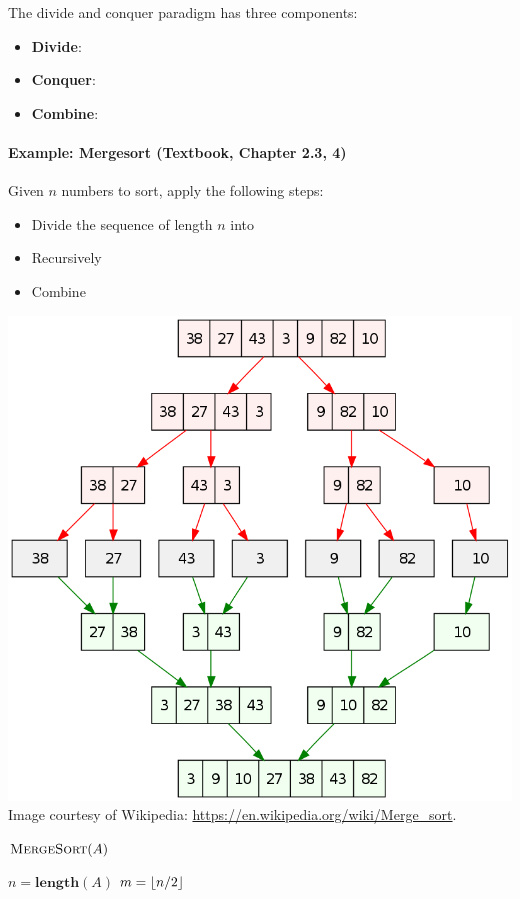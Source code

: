 \documentclass[11  pt]{article}
\begin{document}
The divide and conquer paradigm has three components:
\begin{itemize}
	\setlength\itemsep{2em}
	\item \textbf{Divide}:
	\item \textbf{Conquer}:
	\item \textbf{Combine}:
\end{itemize}

\newpage

\paragraph{Example: Mergesort (Textbook, Chapter 2.3, 4)}
Given $n$ numbers to sort, apply the following steps:
\begin{itemize}
	\item Divide the sequence of length $n$ into %
	\item Recursively %
	\item Combine\\ %
\end{itemize}

\includegraphics[width=.7\linewidth]{merge-sort.png}\\
Image courtesy of Wikipedia: \url{https://en.wikipedia.org/wiki/Merge_sort}.

\begin{algorithm}
	$\textsc{MergeSort}(A)$ 
	\begin{algorithmic}
		\State $n = \textbf{length}(A)$
		\State %
		\Else
		\State $m = \lfloor n/2\rfloor$
		\State
		\State
		\State
		\State
		\State
	    \State
	    \State
		\State
		\EndIf
	\end{algorithmic}
\end{algorithm}
\end{document}
